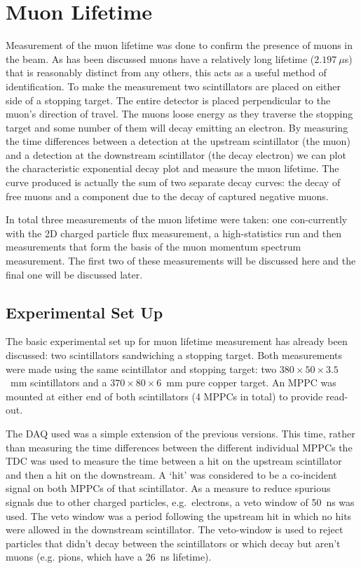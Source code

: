 \clearpage

\section{Muon Lifetime} %
\label{cha:muon_lifetime}
Measurement of the muon lifetime was done to confirm the presence of muons in the beam. As has been discussed muons have a relatively long lifetime (\(2.197~\mu\)s) that is reasonably distinct from any others, this acts as a useful method of identification. To make the measurement two scintillators are placed on either side of a stopping target. The entire detector is placed perpendicular to the muon's direction of travel. The muons loose energy as they traverse the stopping target and some number of them will decay emitting an electron. By measuring the time differences between a detection at the upstream scintillator (the muon) and a detection at the downstream scintillator (the decay electron) we can plot the characteristic exponential decay plot and measure the muon lifetime. The curve produced is actually the sum of two separate decay curves: the decay of free muons and a component due to the decay of captured negative muons.

In total three measurements of the muon lifetime were taken: one con-currently with the 2D charged particle flux measurement, a high-statistics run and then measurements that form the basis of the muon momentum spectrum measurement. The first two of these measurements will be discussed here and the final one will be discussed later.

\subsection{Experimental Set Up} %
\label{sec:experimental_set_up}
The basic experimental set up for muon lifetime measurement has already been discussed: two scintillators sandwiching a stopping target. Both measurements were made using the same scintillator and stopping target: two \( 380\times50\times3.5 \)~mm scintillators and a \( 370\times80\times6 \)~mm pure copper target. An MPPC was mounted at either end of both scintillators (4 MPPCs in total) to provide read-out.

The DAQ used was a simple extension of the previous versions. This time, rather than measuring the time differences between the different individual MPPCs the TDC was used to measure the time between a hit on the upstream scintillator and then a hit on the downstream. A `hit' was considered to be a co-incident signal on both MPPCs of that scintillator. As a measure to reduce spurious signals due to other charged particles, e.g.\ electrons, a veto window of 50~ns was used. The veto window was a period following the upstream hit in which no hits were allowed in the downstream scintillator. The veto-window is used to reject particles that didn't decay between the scintillators or which decay but aren't muons (e.g. pions, which have a 26~ns lifetime).

